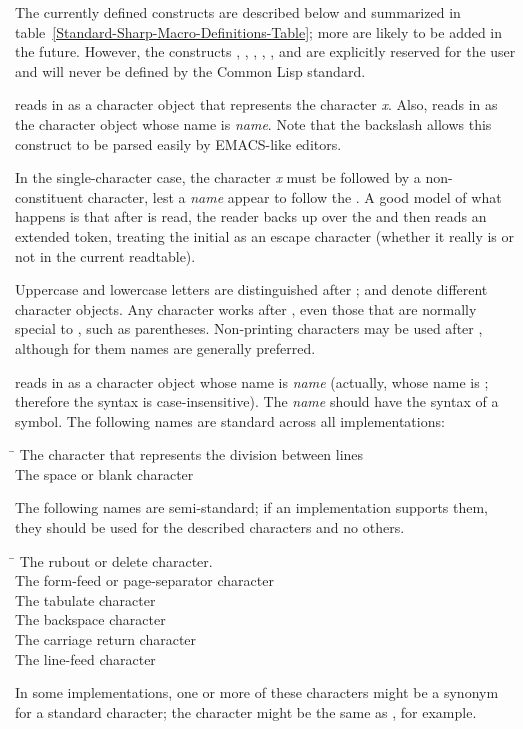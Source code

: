 The currently defined \cd{\#} constructs are described below
and summarized in table~\ref{Standard-Sharp-Macro-Definitions-Table};
more are likely to be added in the future.  However, the constructs
\cd{\#!}, , \cd{\#{\Xlbracket}}, \cd{\#{\Xrbracket}},
\cd{\#{\Xlbrace}}, and \cd{\#{\Xrbrace}}
are explicitly reserved for the user and will never be defined by the
Common Lisp standard.
\begin{flushdesc}
\item[\cd{\#{\Xbackslash}}]
 reads in as a character object that represents the
character {\it x}.  Also,  reads in as the character object
whose name is {\it name}.
Note that the backslash \cd{{\Xbackslash}} allows this
construct to be parsed easily by {EMACS}-like editors.

In the single-character case, the character {\it x} must be followed
by a non-constituent character, lest a {\it name} appear to follow the
\cd{\#{\Xbackslash}}.  A good model of what happens is that after \cd{\#{\Xbackslash}} is read,
the reader backs up over the \cd{{\Xbackslash}} and then reads an extended token,
treating the initial \cd{{\Xbackslash}} as an escape character (whether it really
is or not in the current readtable).

Uppercase and lowercase letters are distinguished after \cd{\#{\Xbackslash}};
 and  denote different character objects.  Any
character works after \cd{\#{\Xbackslash}}, even those that are normally special to
, such as parentheses.  Non-printing characters may be used
after \cd{\#{\Xbackslash}}, although for them names are generally preferred.

 reads in as a character object whose name is {\it name}
(actually, whose name is ;
therefore the syntax is case-insensitive).
The {\it name} should have the syntax of a symbol.
The following names are standard across all implementations:
\begin{tabbing}
\hskip 7pc\=\kill
{}\>The character that represents the division between lines \\
\>The space or blank character
\end{tabbing}
The following names are semi-standard; if an implementation supports
them, they should be used for the described characters and no others.
\begin{tabbing}
\hskip 7pc\=\kill
{}\>The rubout or delete character.\\
\>The form-feed or page-separator character \\
\>The tabulate character \\
\>The backspace character \\
\>The carriage return character \\
\>The line-feed character
\end{tabbing}
In some implementations, one or more of these characters might be
a synonym for a standard character; the  character
might be the same as , for example.


\end{flushdesc}
